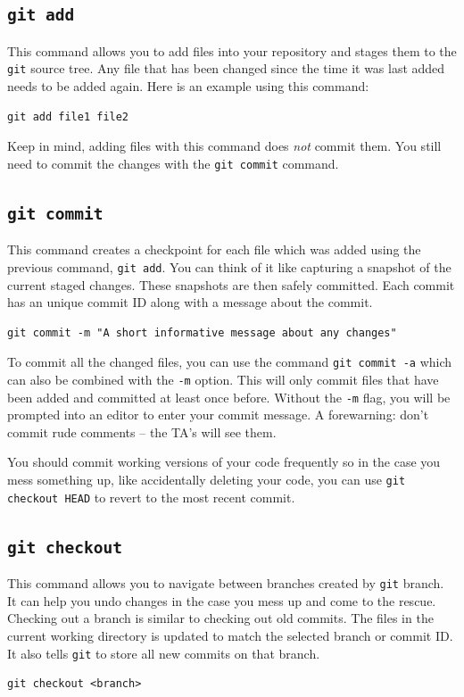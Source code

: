 \documentclass[11pt]{article}
\begin{document}
\subsection{\texttt{git add}}
This command allows you to add files into your repository and stages them to
the \texttt{git} source tree. Any file that has been changed since the time it was last
added needs to be added again. Here is an example using this command:
\begin{lstlisting}
git add file1 file2
\end{lstlisting}

Keep in mind, adding files with this command does \emph{not} commit them. You still need to commit the changes with the \texttt{git commit} command.

\subsection{\texttt{git commit}}
This command creates a checkpoint for each file which was added using the previous command, \texttt{git add}. You can think of it like capturing a snapshot of the current staged changes. These snapshots are then safely committed. Each commit has an unique commit ID along with a message about the commit.
\begin{lstlisting}
git commit -m "A short informative message about any changes"
\end{lstlisting}

To commit all the changed files, you can use the command \texttt{git commit -a} which can also be combined with the \texttt{-m} option. This will only commit files that have been added and committed at least once before. Without the \texttt{-m} flag, you will be prompted into an editor to enter your commit message. A forewarning: don't commit rude comments -- the TA's will see them.

You should commit working versions of your code frequently so in the case you mess something up, like accidentally deleting your code, you can use \texttt{git checkout HEAD} to revert to the most recent commit.

\subsection{\texttt{git checkout}}
This command allows you to navigate between branches created by \texttt{git} branch. It can help you undo changes in the case you mess up and come to the rescue. Checking out a branch is similar to checking out old commits. The files in the current working directory is updated to match the selected branch or commit ID. It also tells \texttt{git} to store all new commits on that branch.
\begin{lstlisting}
git checkout <branch>
\end{lstlisting}
\end{document}
